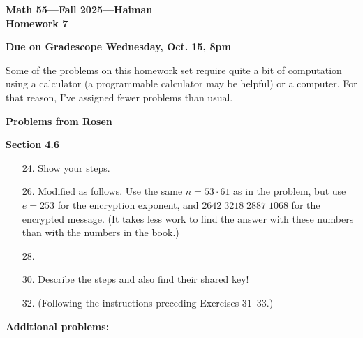 \documentclass{article}
\begin{document}
\begin{center}
    \textbf{\LARGE Math 55—Fall 2025—Haiman} \\[6pt]
    \textbf{\Large Homework 7} \\[6pt]
\end{center}

\vspace{1em}

\noindent \textbf{Due on Gradescope Wednesday, Oct. 15, 8pm}

\bigskip

Some of the problems on this homework set require quite a bit of computation using a calculator (a programmable calculator may be helpful) or a computer. For that reason, I’ve assigned fewer problems than usual.

\bigskip

\noindent \textbf{Problems from Rosen}

\medskip

\noindent \textbf{Section 4.6}
\begin{itemize}
    \item[24.] Show your steps.

    \item[26.] Modified as follows. Use the same $n = 53 \cdot 61$ as in the problem, but use $e = 253$ for the encryption exponent, and $2642\;3218\;2887\;1068$ for the encrypted message. (It takes less work to find the answer with these numbers than with the numbers in the book.)

    \item[28.]

    \item[30.] Describe the steps and also find their shared key!

    \item[32.] (Following the instructions preceding Exercises 31–33.)
\end{itemize}

\bigskip

\noindent \textbf{Additional problems:}
\end{document}
